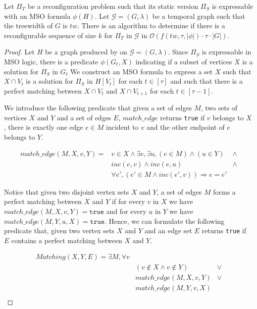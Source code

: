 \begin{theoremrep}
  \label{theorem:mso}
  Let $\Pi_T$ be a reconfiguration problem such that its static version $\Pi_S$ is expressable with an MSO formula $\phi(H)$.
  Let $\mathcal{G}=(G,\lambda)$ be a temporal graph such that the treewidth of $G$ is $tw$. There is an algorithm to determine if there is a reconfigurable sequence of size $k$ for $\Pi_T$ in $\mathcal{G}$ in $\mathcal{O}(f(tw,\tau,|\phi|) \cdot \tau\cdot|G|)$.
\end{theoremrep}

\begin{proof}

  Let $H$ be a graph produced by  on $\mathcal{G}=(G,\lambda)$. Since $\Pi_S$ is expressable in MSO logic, there is a predicate $\phi(G_t,X)$ indicating if a subset of vertices $X$ is a solution for $\Pi_S$ in $G_t$ 
  We construct an MSO formula to express a set $X$ such that $X \cap V_t$ is a solution for $\Pi_S$ in $H[V_t]$ for each $t \in [\tau]$ and such that there is a perfect matching between $X \cap V_t$ and $X \cap V_{t+1}$ for each $t \in [\tau-1]$.


We introduce the following predicate that given a set of edges $M$, two sets of vertices $X$ and $Y$ and a set of edges $E$, $match\_edge$ returns \texttt{true} if
$v$ belongs to $X$,
there is exactly one edge $e\in M$ incident to $v$ and
the other endpoint of $e$ belongs to $Y$. 


\begin{eqnarray*}
  match\_edge(M,X,v,Y) = &  v \in X \wedge \exists e, \exists u, (e \in M) \wedge (u \in Y) &\wedge  \\
  & inc(e,v) \wedge inc(e,u) &\wedge  \\
  & \forall e', (e'\in M \wedge inc(e',v)) \Rightarrow e = e'&
  \end{eqnarray*}

  Notice that given two disjoint vertex sets $X$ and $Y$, a set of edges $M$ forms a perfect matching between $X$ and $Y$ if for every $v$ in $X$ we have $match\_edge(M,X,v,Y)= \texttt{true}$ and for every $u$ in $Y$ we have $match\_edge(M,Y,u,X) = \texttt{true}$.
  Hence, we can formulate the following predicate that, given two vertex sets $X$ and $Y$ and an edge set $E$ returns \texttt{true} if $E$ contains a perfect matching between $X$ and $Y$.


\begin{eqnarray*}
  Matching(X,Y,E) =
  \exists M, \forall v & &\\
                       & (v\not\in X  \wedge v \not\in Y ) &\vee\\
                       & match\_edge(M,X,v,Y) &\vee \\
                       &match\_edge(M,Y,v,X) &\\
\end{eqnarray*}


\end{proof}
